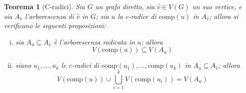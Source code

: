 \documentclass[14pt]{extreport}
\newtheorem{theorem}{Teorema}[subsection]
\theoremstyle{definition}
\theoremstyle{definition}
\begin{document}
\begin{theorem}[C-radici]
    \label{cradiciteorema}
    Sia $G$ un grafo diretto, sia $\hat v \in V(G)$ un suo vertice, e sia $A_{\hat v}$ l'arborescenza di $\hat v$ in $G$; sia $u$ la c-radice di $\mathrm{comp}(u)$ in $A_{\hat v}$; allora si verificano le seguenti proposizioni:

    \begin{enumerate}[i)]
        \item sia $A_u \subseteq A_{\hat v}$ è l'arborescenza radicata in $u$; allora $$V(\mathrm{comp}(u)) \subseteq V(A_u)$$
        \item siano $u_1, \ldots, u_k$ le c-radici di $\mathrm{comp}(u_1), \ldots, \mathrm{comp}(u_k)$ in $A_u \subseteq A_{\hat v}$; allora $$V(\mathrm{comp}(u)) \cup \displaystyle \bigcup_{i = 1}^k {V(\mathrm{comp}(u_i))} = V(A_u)$$
    \end{enumerate}
\end{theorem}
\end{document}
